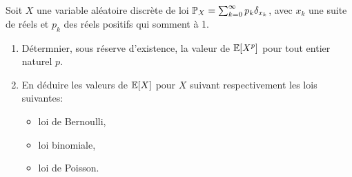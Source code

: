 \begin{td-exo}[] %
    Soit \(X\) une variable aléatoire discrète de loi 
    \(\mathbb{P}_X = \sum_{k=0}^\infty p_k\delta_{x_k}\), avec
    \(x_k\) une suite de réels et \(p_k\) des réels positifs qui
    somment à 1.
    \begin{enumerate}
        \item Détermnier, sous réserve d'existence, la valeur
        de \(\mathbb{E}\mathopen{}\left[X^p\right]\mathclose{}\) pour tout entier naturel \(p\).

        \item En déduire les valeurs de \(\mathbb{E}\mathopen{}\left[X\right]\mathclose{}\) pour \(X\) 
        suivant respectivement les lois suivantes:
        \begin{itemize}
            \item loi de Bernoulli,
            \item loi binomiale,
            \item loi de Poisson.
        \end{itemize}
    \end{enumerate}
\end{td-exo}
